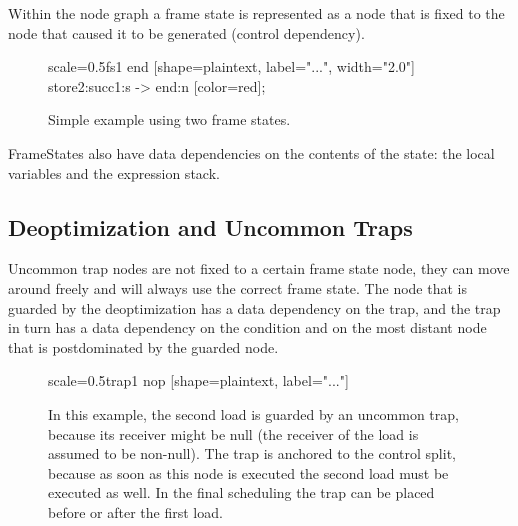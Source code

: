 \documentclass[twocolumn]{svjour3}
\begin{document}
Within the node graph a frame state is represented as a node that is fixed to the node that caused it to be generated (control dependency).


\begin{figure}[h]
  \label{fig:fs1}
  \centering
\begin{digraphenv}{scale=0.5}{fs1}
    end [shape=plaintext, label="...", width="2.0"]
    store2:succ1:s -> end:n [color=red];
\end{digraphenv}
  \caption{Simple example using two frame states.}
\end{figure}

FrameStates also have data dependencies on the contents of the state: the local variables and the expression stack.

\subsection{Deoptimization and Uncommon Traps}
Uncommon trap nodes are not fixed to a certain frame state node, they can move around freely and will always use the correct frame state.
The node that is guarded by the deoptimization has a data dependency on the trap, and the trap in turn has a data dependency on the condition and on the most distant node that is postdominated by the guarded node.

\begin{figure}[h]
  \label{fig:trap1}
  \centering
\begin{digraphenv}{scale=0.5}{trap1}
    nop [shape=plaintext, label="..."]
\end{digraphenv}
  \caption{In this example, the second load is guarded by an uncommon trap, because its receiver might be null (the receiver of the load is assumed to be non-null).
The trap is anchored to the control split, because as soon as this node is executed the second load must be executed as well.
In the final scheduling the trap can be placed before or after the first load.}
\end{figure}
\end{document}
